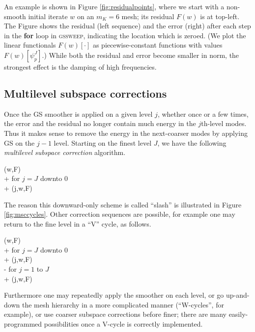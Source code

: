 \documentclass[letterpaper,final,12pt,reqno]{amsart}
\theoremstyle{claim}
\numberwithin{equation}{section}
\numberwithin{figure}{section}
\numberwithin{table}{section}
\begin{document}
An example is shown in Figure \ref{fig:residualpoints}, where we start with a non-smooth initial iterate $w$ on an $m_K=6$ mesh; its residual $F(w)$ is at top-left.  The Figure shows the residual (left sequence) and the error (right) after each step in the \textbf{for} loop in \textsc{gssweep}, indicating the location which is zeroed.  (We plot the linear functionals $F(w)[\cdot]$ as piecewise-constant functions with values $F(w)[\psi_p^J]$.)  While both the residual and error become smaller in norm, the strongest effect is the damping of high frequencies.

\subsection*{Multilevel subspace corrections}  Once the GS smoother is applied on a given level $j$, whether once or a few times, the error and the residual no longer contain much energy in the $j$th-level modes.  Thus it makes sense to remove the energy in the next-coarser modes by applying GS on the $j-1$ level.  Starting on the finest level $J$, we have the following \emph{multilevel subspace correction} algorithm.
\begin{pseudo*}
(w,F)\text{:} \\+
    for $j=J$ downto $0$ \\+
        (j,w,F)
\end{pseudo*}

The reason this downward-only scheme is called ``slash'' is illustrated in Figure \ref{fig:msccycles}.  Other correction sequences are possible, for example one may return to the fine level in a ``V'' cycle, as follows.
\begin{pseudo*}
(w,F)\text{:} \\+
    for $j=J$ downto $0$ \\+
        (j,w,F) \\-
    for $j=1$ to $J$ \\+
        (j,w,F)
\end{pseudo*}
Furthermore one may repeatedly apply the smoother on each level, or go up-and-down the mesh hierarchy in a more complicated manner (``W-cycles'', for example), or use coarser subspace corrections before finer; there are many easily-programmed possibilities \cite{Briggsetal2000,Trottenbergetal2001} once a V-cycle is correctly implemented.
\end{document}
